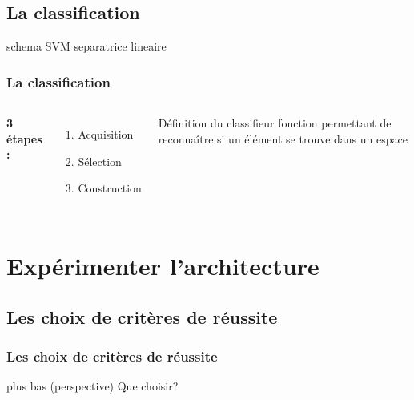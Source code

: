 \documentclass{beamer}
\begin{document}
\subsection{La classification}
\begin{frame}
	schema SVM
    separatrice lineaire
  \frametitle{La classification}
  \begin{columns}[c]
      \textbf{3 étapes :}
      \begin{enumerate}
        \item Acquisition
        \item Sélection
        \item Construction
      \end{enumerate}

      \begin{block}{Définition du classifieur}
      	fonction permettant de reconnaître si un élément se trouve dans un espace
      \end{block}
  \end{columns}
\end{frame}

\section{Expérimenter l'architecture}

\subsection{Les choix de critères de réussite}
\begin{frame}
  \frametitle{Les choix de critères de réussite}
  \centering
  plus bas (perspective)
  \Huge{Que choisir?}
\end{frame}
\end{document}
